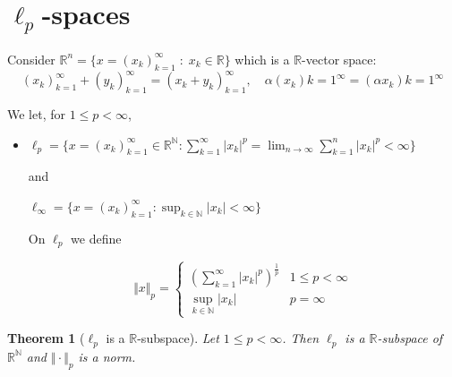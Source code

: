 \documentclass[11pt, oneside]{book}
\theoremstyle{break}
\newtheorem{thm}{Theorem}[section]
\newcommand{\bb}[1]{\mathbb{#1}}			%
\begin{document}
\section{\texorpdfstring{$\ell_p$}{lp}-spaces}\label{sect:lp spaces}

Consider $\bb{R}^n = \{x = (x_k)_{k=1}^\infty \; : \; x_k \in \bb{R}\}$ which is a $\bb{R}$-vector space:
\begin{equation}
	(x_k)_{k=1}^\infty + (y_k)_{k=1}^\infty = (x_k + y_k)_{k = 1}^\infty, \quad \alpha(x_k){k=1}^\infty = (\alpha x_k){k=1}^\infty
\end{equation}

We let, for $1 \leq p < \infty$,
\begin{itemize}
	\item $\ell_p = \{x = (x_k)_{k=1}^\infty \in \bb{R}^\bb{N} : \sum_{k=1}^{\infty} |x_k|^p = \lim_{n \to \infty} \sum_{k=1}^{n} |x_k|^p < \infty \}$
		
		and

		$\ell_\infty = \{x = (x_k)_{k=1}^\infty : \sup_{k \in \bb{N}} |x_k| < \infty \}$

		On $\ell_p$ we define

		\begin{equation}
			\Vert x\Vert _p =
			\begin{cases}
				\left( \sum_{k=1}^{\infty} |x_k|^p \right)^{\frac{1}{p}}	&	1 \leq p < \infty \\
				\sup_{k \in \bb{N}} |x_k|		&		p = \infty
			\end{cases}
		\end{equation}
\end{itemize}

\begin{thm}[$\ell_p$ is a $\bb{R}$-subspace]
	Let $1 \leq p < \infty$. Then $\ell_p$ is a $\bb{R}$-subspace of $\bb{R}^\bb{N}$ and $\Vert \cdot\Vert _p$ is a norm.
\end{thm}
\end{document}

